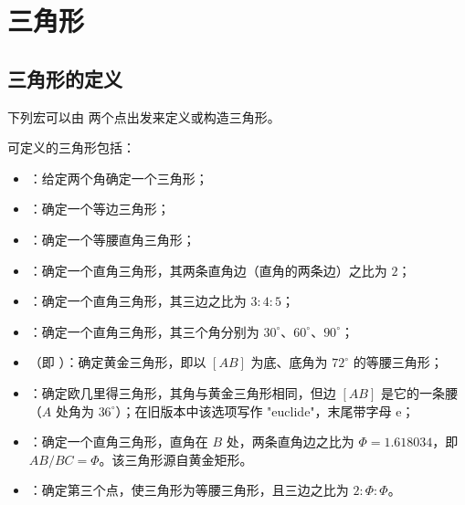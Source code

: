 \section{三角形}

\subsection{三角形的定义 }
下列宏可以由  两个点出发来定义或构造三角形。

 可定义的三角形包括：
 \begin{itemize}
\item  {}：给定两个角确定一个三角形；
\item  {}：确定一个等边三角形；
\item  {}：确定一个等腰直角三角形；
\item {}：确定一个直角三角形，其两条直角边（直角的两条边）之比为 $2$；
\item {}：确定一个直角三角形，其三边之比为 $3:4:5$；
\item {}：确定一个直角三角形，其三个角分别为 $30^\circ$、$60^\circ$、$90^\circ$；
\item {}（即 ）：确定黄金三角形，即以 $[AB]$ 为底、底角为 $72^\circ$ 的等腰三角形；

\item {}：确定欧几里得三角形，其角与黄金三角形相同，但边 $[AB]$ 是它的一条腰（$A$ 处角为 $36^\circ$）；在旧版本中该选项写作 "euclide"，末尾带字母 e；

\item {}：确定一个直角三角形，直角在 $B$ 处，两条直角边之比为 $\Phi=1.618034$，即 $AB/BC=\Phi$。该三角形源自黄金矩形。

\item {}：确定第三个点，使三角形为等腰三角形，且三边之比为 $2:\Phi:\Phi$。
\end{itemize}

